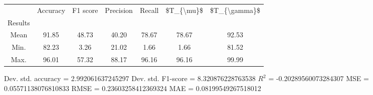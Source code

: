 \begin{tabular}{|c|c|c|c|c|c|c|}
\toprule
{} &  Accuracy &  F1 score &  Precision &  Recall &  \$T\_\{\textbackslash mu\}\$ &  \$T\_\{\textbackslash gamma\}\$ \\
Results &           &           &            &         &            &               \\
\hline
Mean    &     91.85 &     48.73 &      40.20 &   78.67 &      78.67 &         92.53 \\
Min.    &     82.23 &      3.26 &      21.02 &    1.66 &       1.66 &         81.52 \\
Max.    &     96.01 &     57.32 &      88.17 &   96.16 &      96.16 &         99.99 \\
\bottomrule
\end{tabular}

 Dev. std. accuracy = 2.992061637245297
 Dev. std. F1-score = 8.320876228763538
 $R^2$ = -0.20289560073284307
 MSE = 0.05571138076810833
 RMSE = 0.23603258412369324
 MAE = 0.08199549267518012
